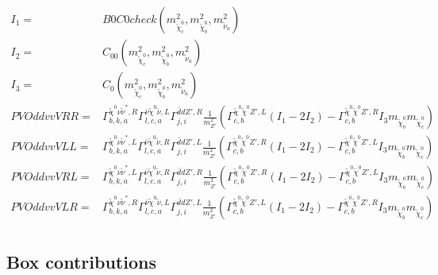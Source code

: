 \documentclass[A4,landscape]{article}
\begin{document}
\begin{align} 
I_1= & B0C0check(m^2_{\tilde{\chi}^0_{{c}}}, m^2_{\tilde{\chi}^0_{{b}}}, m^2_{\tilde{\nu}_{{a}}}) \\ 
I_2= & C_{00}(m^2_{\tilde{\chi}^0_{{c}}}, m^2_{\tilde{\chi}^0_{{b}}}, m^2_{\tilde{\nu}_{{a}}}) \\ 
I_3= & C_0(m^2_{\tilde{\chi}^0_{{c}}}, m^2_{\tilde{\chi}^0_{{b}}}, m^2_{\tilde{\nu}_{{a}}}) \\ 
  PVOddvvVRR= &  \Gamma^{\tilde{\chi}^0 \nu \tilde{\nu}^*,R}_{b, k, a} \Gamma^{\bar{\nu}\tilde{\chi}^0 \tilde{\nu} ,L}_{l, c, a} \Gamma^{\bar{d}d {Z'} ,R}_{j, i} \frac{1}{m^2_{{Z'}}} (\Gamma^{\tilde{\chi}^0 \tilde{\chi}^0 {Z'} ,L}_{c, b} (I_1 - 2 I_2) - \Gamma^{\tilde{\chi}^0 \tilde{\chi}^0 {Z'} ,R}_{c, b} I_3 m_{\tilde{\chi}^0_{{b}}} m_{\tilde{\chi}^0_{{c}}}) \\ 
  PVOddvvVLL= &  \Gamma^{\tilde{\chi}^0 \nu \tilde{\nu}^*,L}_{b, k, a} \Gamma^{\bar{\nu}\tilde{\chi}^0 \tilde{\nu} ,R}_{l, c, a} \Gamma^{\bar{d}d {Z'} ,L}_{j, i} \frac{1}{m^2_{{Z'}}} (\Gamma^{\tilde{\chi}^0 \tilde{\chi}^0 {Z'} ,R}_{c, b} (I_1 - 2 I_2) - \Gamma^{\tilde{\chi}^0 \tilde{\chi}^0 {Z'} ,L}_{c, b} I_3 m_{\tilde{\chi}^0_{{b}}} m_{\tilde{\chi}^0_{{c}}}) \\ 
  PVOddvvVRL= &  \Gamma^{\tilde{\chi}^0 \nu \tilde{\nu}^*,L}_{b, k, a} \Gamma^{\bar{\nu}\tilde{\chi}^0 \tilde{\nu} ,R}_{l, c, a} \Gamma^{\bar{d}d {Z'} ,R}_{j, i} \frac{1}{m^2_{{Z'}}} (\Gamma^{\tilde{\chi}^0 \tilde{\chi}^0 {Z'} ,R}_{c, b} (I_1 - 2 I_2) - \Gamma^{\tilde{\chi}^0 \tilde{\chi}^0 {Z'} ,L}_{c, b} I_3 m_{\tilde{\chi}^0_{{b}}} m_{\tilde{\chi}^0_{{c}}}) \\ 
  PVOddvvVLR= &  \Gamma^{\tilde{\chi}^0 \nu \tilde{\nu}^*,R}_{b, k, a} \Gamma^{\bar{\nu}\tilde{\chi}^0 \tilde{\nu} ,L}_{l, c, a} \Gamma^{\bar{d}d {Z'} ,L}_{j, i} \frac{1}{m^2_{{Z'}}} (\Gamma^{\tilde{\chi}^0 \tilde{\chi}^0 {Z'} ,L}_{c, b} (I_1 - 2 I_2) - \Gamma^{\tilde{\chi}^0 \tilde{\chi}^0 {Z'} ,R}_{c, b} I_3 m_{\tilde{\chi}^0_{{b}}} m_{\tilde{\chi}^0_{{c}}}) \\ 
\end{align} 
\subsection{Box contributions} 
\end{document}
